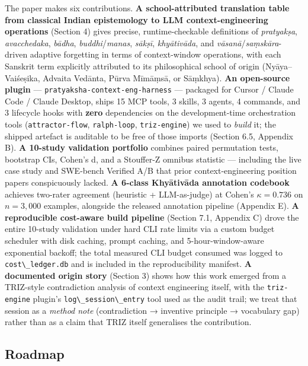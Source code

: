 The paper makes six contributions. \textbf{A school-attributed translation table from classical Indian epistemology to LLM context-engineering operations} (Section 4) gives precise, runtime-checkable definitions of \emph{pratyakṣa}, \emph{avacchedaka}, \emph{bādha}, \emph{buddhi}/\emph{manas}, \emph{sākṣī}, \emph{khyātivāda}, and \emph{vāsanā}/\emph{saṃskāra}-driven adaptive forgetting in terms of context-window operations, with each Sanskrit term explicitly attributed to its philosophical school of origin (Nyāya--Vaiśeṣika, Advaita Vedānta, Pūrva Mīmāṃsā, or Sāṃkhya). \textbf{An open-source plugin} --- \passthrough{\lstinline!pratyaksha-context-eng-harness!} --- packaged for Cursor / Claude Code / Claude Desktop, ships 15 MCP tools, 3 skills, 3 agents, 4 commands, and 3 lifecycle hooks with \textbf{zero} dependencies on the development-time orchestration tools (\passthrough{\lstinline!attractor-flow!}, \passthrough{\lstinline!ralph-loop!}, \passthrough{\lstinline!triz-engine!}) we used to \emph{build} it; the shipped artefact is auditable to be free of those imports (Section 6.5, Appendix B). \textbf{A 10-study validation portfolio} combines paired permutation tests, bootstrap CIs, Cohen's d, and a Stouffer-Z omnibus statistic --- including the live case study and SWE-bench Verified A/B that prior context-engineering position papers conspicuously lacked. \textbf{A 6-class Khyātivāda annotation codebook} achieves two-rater agreement (heuristic + LLM-as-judge) at Cohen's \(\kappa = \mathbf{0.736}\) on \(n = 3{,}000\) examples, alongside the released annotation pipeline (Appendix E). \textbf{A reproducible cost-aware build pipeline} (Section 7.1, Appendix C) drove the entire 10-study validation under hard CLI rate limits via a custom budget scheduler with disk caching, prompt caching, and 5-hour-window-aware exponential backoff; the total measured CLI budget consumed was logged to \passthrough{\lstinline!cost\_ledger.db!} and is included in the reproducibility manifest. \textbf{A documented origin story} (Section 3) shows how this work emerged from a TRIZ-style contradiction analysis of context engineering itself, with the \passthrough{\lstinline!triz-engine!} plugin's \passthrough{\lstinline!log\_session\_entry!} tool used as the audit trail; we treat that session as a \emph{method note} (contradiction → inventive principle → vocabulary gap) rather than as a claim that TRIZ itself generalises the contribution.

\subsection{Roadmap}\label{roadmap}

